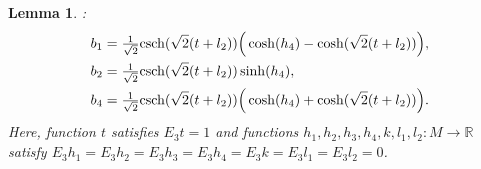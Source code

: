 \documentclass[reqno]{amsart}%
\newtheorem{lemma}[theorem]{Lemma}
\theoremstyle{definition}
\numberwithin{equation}{section}
\begin{document}
\begin{lemma}

: %
\begin{equation}\label{eq:jj4}
\begin{aligned}
b_1&=\tfrac{1}{\sqrt{2}}{\rm csch}(\sqrt{2}(t+l_2))\Big(\cosh(h_4)-\cosh(\sqrt{2}(t+l_2))\Big),\\
b_2&=\tfrac{1}{\sqrt{2}}{\rm csch}(\sqrt{2}(t+l_2))\sinh(h_4),\\
b_4&=\tfrac{1}{\sqrt{2}}{\rm csch}(\sqrt{2}(t+l_2))\Big(\cosh(h_4)+\cosh(\sqrt{2}(t+l_2))\Big).
\end{aligned}	
\end{equation}
Here, function $t$ satisfies $E_3t=1$ and functions $h_1,h_2,h_3,h_4, k, l_1, l_2:M\rightarrow \mathbb{R}$
satisfy $E_3h_1=E_3h_2=E_3h_3=E_3h_4=E_3k=E_3l_1=E_3l_2=0$.
\end{lemma}
%
\end{document}
